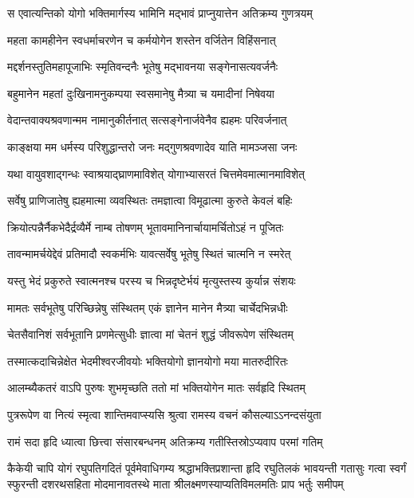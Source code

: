 \twolineshloka
{स एवात्यन्तिको योगो भक्तिमार्गस्य भामिनि}
{मद्भावं प्राप्नुयात्तेन अतिक्रम्य गुणत्रयम्} %

\twolineshloka
{महता कामहीनेन स्वधर्माचरणेन च}
{कर्मयोगेन शस्तेन वर्जितेन विहिंसनात्} %

\twolineshloka
{मद्दर्शनस्तुतिमहापूजाभिः स्मृतिवन्दनैः}
{भूतेषु मद्भावनया सङ्गेनासत्यवर्जनैः} %

\twolineshloka
{बहुमानेन महतां दुःखिनामनुकम्पया}
{स्वसमानेषु मैत्र्या च यमादीनां निषेवया} %

\twolineshloka
{वेदान्तवाक्यश्रवणान्मम नामानुकीर्तनात्}
{सत्सङ्गेनार्जवेनैव ह्यहमः परिवर्जनात्} %

\twolineshloka
{काङ्क्षया मम धर्मस्य परिशुद्धान्तरो जनः}
{मद्गुणश्रवणादेव याति मामञ्जसा जनः} %

\twolineshloka
{यथा वायुवशाद्गन्धः स्वाश्रयाद्\mbox{}घ्राणमाविशेत्}
{योगाभ्यासरतं चित्तमेवमात्मानमाविशेत्} %

\twolineshloka
{सर्वेषु प्राणिजातेषु ह्यहमात्मा व्यवस्थितः}
{तमज्ञात्वा विमूढात्मा कुरुते केवलं बहिः} %

\twolineshloka
{क्रियोत्पन्नैर्नैकभेदैर्द्रव्यैर्मे नाम्ब तोषणम्}
{भूतावमानिनार्चायामर्चितोऽहं न पूजितः} %

\twolineshloka
{तावन्मामर्चयेद्देवं प्रतिमादौ स्वकर्मभिः}
{यावत्सर्वेषु भूतेषु स्थितं चात्मनि न स्मरेत्} %

\twolineshloka
{यस्तु भेदं प्रकुरुते स्वात्मनश्च परस्य च}
{भिन्नदृष्टेर्भयं मृत्युस्तस्य कुर्यान्न संशयः} %

\twolineshloka
{मामतः सर्वभूतेषु परिच्छिन्नेषु संस्थितम्}
{एकं ज्ञानेन मानेन मैत्र्या चार्चेदभिन्नधीः} %

\twolineshloka
{चेतसैवानिशं सर्वभूतानि प्रणमेत्सुधीः}
{ज्ञात्वा मां चेतनं शुद्धं जीवरूपेण संस्थितम्} %

\twolineshloka
{तस्मात्कदाचिन्नेक्षेत भेदमीश्वरजीवयोः}
{भक्तियोगो ज्ञानयोगो मया मातरुदीरितः} %

\twolineshloka
{आलम्ब्यैकतरं वाऽपि पुरुषः शुभमृच्छति}
{ततो मां भक्तियोगेन मातः सर्वहृदि स्थितम्} %

\twolineshloka
{पुत्ररूपेण वा नित्यं स्मृत्वा शान्तिमवाप्स्यसि}
{श्रुत्वा रामस्य वचनं कौसल्याऽऽनन्दसंयुता} %

\twolineshloka
{रामं सदा हृदि ध्यात्वा छित्त्वा संसारबन्धनम्}
{अतिक्रम्य गतीस्तिस्रोऽप्यवाप परमां गतिम्} %

\fourlineindentedshloka
{कैकेयी चापि योगं रघुपतिगदितं पूर्वमेवाधिगम्य}
{श्रद्धाभक्तिप्रशान्ता हृदि रघुतिलकं भावयन्ती गतासुः}
{गत्वा स्वर्गं स्फुरन्ती दशरथसहिता मोदमानावतस्थे}
{माता श्रीलक्ष्मणस्याप्यतिविमलमतिः प्राप भर्तुः समीपम्} %

